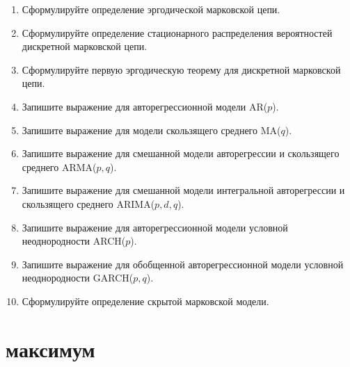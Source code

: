 \documentclass[a4paper,12pt]{extreport}
\renewcommand{\=}[1]{\stackrel{#1}{=}} %
\begin{document}
\begin{enumerate}
	\item Сформулируйте определение эргодической марковской цепи.
	\item Сформулируйте определение стационарного распределения вероятностей
	дискретной марковской цепи.
	\item Сформулируйте первую эргодическую теорему для дискретной марковской цепи.

	\item Запишите выражение для авторегрессионной модели AR($p$).
	\item Запишите выражение для модели скользящего среднего MA($q$).
	\item Запишите выражение для смешанной модели авторегрессии и скользящего среднего ARMA($p, q$).
	\item Запишите выражение для смешанной модели интегральной авторегрессии
	и скользящего среднего ARIMA($p, d, q$).
	\item Запишите выражение для авторегрессионной модели условной неоднородности ARCH($p$).
	\item Запишите выражение для обобщенной авторегрессионной модели
	условной неоднородности GARCH($p, q$).

	\item Сформулируйте определение скрытой марковской модели.

\end{enumerate}

\newpage

\section*{ максимум}
\end{document}

